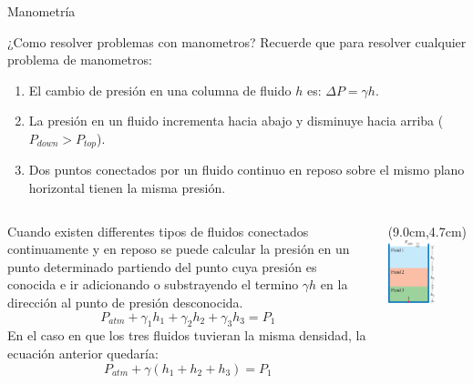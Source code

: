 \documentclass [xcolor=svgnames, t] {beamer}
\begin{document}
\begin{frame}{Manometr\'ia}
\footnotesize
\vspace{-0.5cm}
\begin{block}{¿Como resolver problemas con manometros?}
Recuerde que para resolver cualquier problema de manometros:
\begin{enumerate}
\item El cambio de presi\'on en una columna de fluido $h$ es: $\Delta P = \gamma h$.
\item La presi\'on en un fluido incrementa hacia abajo y disminuye hacia arriba ($P_{down} > P_{top}$).
\item Dos puntos conectados por un fluido continuo en reposo sobre el mismo plano horizontal tienen la misma presi\'on. 
\end{enumerate}
\end{block}
\begin{columns}
Cuando existen differentes tipos de fluidos conectados continuamente y en reposo se puede calcular la presi\'on en un punto determinado partiendo del punto cuya presi\'on es conocida e ir adicionando o substrayendo el termino $\gamma h$ en la direcci\'on al punto de presi\'on desconocida. 
$$
P_{atm} + \gamma_1 h_1 + \gamma_2 h_2 + \gamma_3 h_3 = P_1
$$
En el caso en que los tres fluidos tuvieran la misma densidad, la ecuaci\'on anterior quedar\'ia: 
$$
P_{atm}+\gamma (h_1 + h_2 + h_3) = P_1
$$
\begin{textblock*}{4.5cm}(9.0cm,4.7cm) %
\includegraphics[width=0.6\textwidth]{mano3}
\end{textblock*}
\end{columns}

\end{frame}
\end{document}
